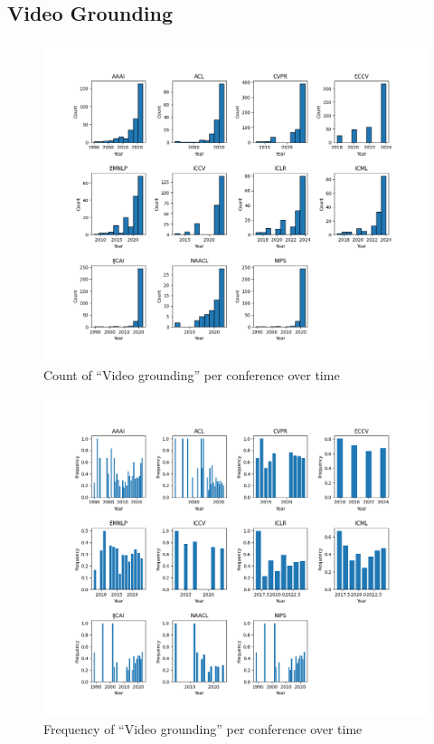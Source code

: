 \documentclass[11pt]{article}
\begin{document}
\subsection{Video Grounding}
\label{sec:appendix_word_sense_years_video}
\begin{figure}[H]
  \includegraphics[width=0.75\columnwidth]{figs/grounding_figs/Video/split_by_conf_grounding_dist.png}
  \centering
  \caption{Count of ``Video grounding'' per conference over time}
  \label{fig:appendix_video_all_confs_count}
\end{figure}

\begin{figure}[H]
  \includegraphics[width=0.75\columnwidth]{figs/freq_grounding_figs/Video/split_by_conf_grounding_dist.png}
  \centering
  \caption{Frequency of ``Video grounding'' per conference over time}
  \label{fig:appendix_video_all_confs_freq}
\end{figure}
\end{document}
